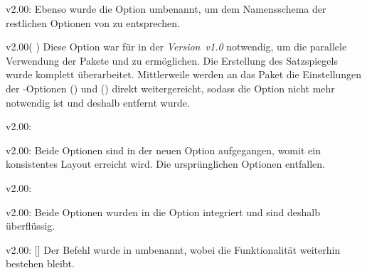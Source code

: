 \begin{Obsolete}{v2.00:}{}
\printobsoletelist%
%
Ebenso wurde die Option  umbenannt, um dem Namensschema der 
restlichen Optionen von \TUDScript zu entsprechen.
\end{Obsolete}

\begin{Obsolete}{v2.00}{}(%
)
\printobsoletelist%
%
Diese Option war für \TUDScript in der \emph{Version~v1.0} notwendig, um die 
parallele Verwendung der Pakete  und  zu 
ermöglichen. Die Erstellung des Satzspiegels wurde komplett überarbeitet. 
Mittlerweile werden an das Paket  die Einstellungen der 
\KOMAScript-Optionen () und 
() direkt weitergereicht, sodass die 
Option  nicht mehr notwendig ist und deshalb entfernt wurde.
\end{Obsolete}

\begin{Obsolete}{v2.00:}{%
}
\begin{Obsolete}{v2.00:}{%
}
\printobsoletelist%
%
Beide Optionen sind in der neuen Option  
aufgegangen, womit ein konsistentes Layout erreicht wird. Die ursprünglichen 
Optionen entfallen. 
\end{Obsolete}
\end{Obsolete}

\begin{Obsolete}{v2.00:}{}
\begin{Obsolete}{v2.00:}{}
\printobsoletelist%
%
Beide Optionen wurden in die Option  integriert und sind 
deshalb überflüssig.
\end{Obsolete}
\end{Obsolete}

\begin{Obsolete}{v2.00:}{%
  []%
}
\printobsoletelist%
%
Der Befehl  wurde in  umbenannt, wobei die 
Funktionalität weiterhin bestehen bleibt.
\end{Obsolete}

